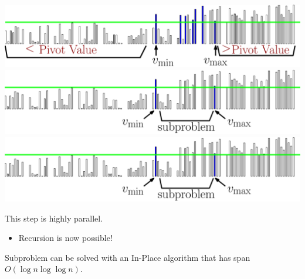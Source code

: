 \documentclass[xcolor=x11names, svgnames, rgb]{beamer}
\begin{document}
\begin{frame}[t]{}
\begin{overprint}
	\includegraphics[width=\linewidth]{imgs/smoothedAlgSim/smoothedAlgSim_4.eps}
	\onslide<6>\includegraphics[width=\linewidth]{imgs/smoothedAlgSim/smoothedAlgSim_45.eps}
	\onslide<7>\includegraphics[width=\linewidth]{imgs/smoothedAlgSim/smoothedAlgSim_45.eps}
	\end{overprint}
	\vspace{0.25cm}
	\begin{overprint}
	This step is highly parallel.
 \begin{itemize} \item Recursion is now possible!  \end{itemize} \vspace{1cm} Subproblem can be solved with an In-Place algorithm that has span $O(\log n \log \log n)$.
	\end{overprint}
\end{frame}
\end{document}
